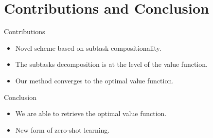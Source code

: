 \documentclass{beamer}
\theoremstyle{mystyle}
\newcommand{\cS}{\mathcal{S}}
\begin{document}
\section{Contributions and Conclusion}
\begin{frame}{Contributions}
    \begin{itemize}
    \item Novel scheme based on subtask compositionality. 
    \item The subtasks decomposition is at the level of the value function.
    \item Our method converges to the optimal value function.

\end{itemize}

\end{frame}

\begin{frame}{Conclusion}

    \begin{itemize}
        \item We are able to retrieve the optimal value function.
        \item New form of zero-shot learning.
    \end{itemize}

\end{frame}


\begin{frame}[allowframebreaks]{}
    
    
\end{frame}
\end{document}
